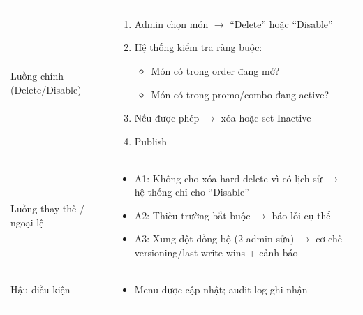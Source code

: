 \begin{longtable}{|>{\raggedright\arraybackslash}p{}|>{\raggedright\arraybackslash}p{}|}
\vspace{-0.5em}
\\
\hline
Luồng chính (Delete/Disable) &
\vspace{-0.5em}
\begin{enumerate}[leftmargin=*]
\item Admin chọn món $\rightarrow$ “Delete” hoặc “Disable”
\item Hệ thống kiểm tra ràng buộc:
\vspace{-0.5em}
\begin{itemize}[leftmargin=*]
\item Món có trong order đang mở?
\item Món có trong promo/combo đang active?
\end{itemize}
\vspace{-0.5em}
\item Nếu được phép $\rightarrow$ xóa hoặc set Inactive
\item Publish
\end{enumerate}
\vspace{-0.5em}
\\
\hline
Luồng thay thế / ngoại lệ &
\vspace{-0.5em}
\begin{itemize}[leftmargin=*]
\item A1: Không cho xóa hard-delete vì có lịch sử $\rightarrow$ hệ thống chỉ cho “Disable”
\item A2: Thiếu trường bắt buộc $\rightarrow$ báo lỗi cụ thể
\item A3: Xung đột đồng bộ (2 admin sửa) $\rightarrow$ cơ chế versioning/last-write-wins + cảnh báo
\end{itemize}
\vspace{-0.5em}
\\
\hline
Hậu điều kiện &
\vspace{-0.5em}
\begin{itemize}[leftmargin=*]
\item Menu được cập nhật; audit log ghi nhận
\end{itemize}
\vspace{-0.5em}
\\
\hline
\end{longtable}

